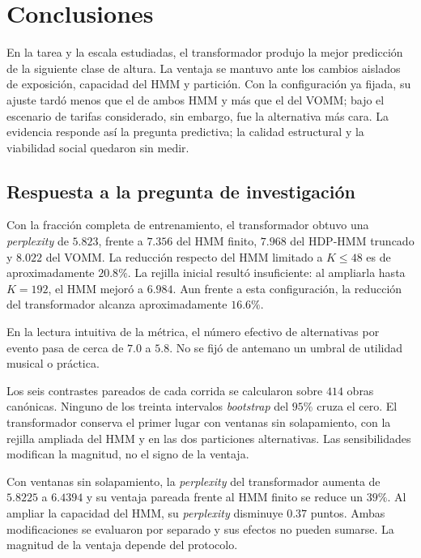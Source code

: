 \chapter{Conclusiones}
\label{chap:conclusiones}

En la tarea y la escala estudiadas, el transformador produjo la mejor predicción de la siguiente clase de altura. La ventaja se mantuvo ante los cambios aislados de exposición, capacidad del HMM y partición. Con la configuración ya fijada, su ajuste tardó menos que el de ambos HMM y más que el del VOMM; bajo el escenario de tarifas considerado, sin embargo, fue la alternativa más cara. La evidencia responde así la pregunta predictiva; la calidad estructural y la viabilidad social quedaron sin medir.

\section{Respuesta a la pregunta de investigación}

Con la fracción completa de entrenamiento, el transformador obtuvo una \emph{perplexity} de $5.823$, frente a $7.356$ del HMM finito, $7.968$ del HDP-HMM truncado y $8.022$ del VOMM. La reducción respecto del HMM limitado a $K\leq48$ es de aproximadamente $20.8\%$. La rejilla inicial resultó insuficiente: al ampliarla hasta $K=192$, el HMM mejoró a $6.984$. Aun frente a esta configuración, la reducción del transformador alcanza aproximadamente $16.6\%$.

En la lectura intuitiva de la métrica, el número efectivo de alternativas por evento pasa de cerca de $7.0$ a $5.8$. No se fijó de antemano un umbral de utilidad musical o práctica.

Los seis contrastes pareados de cada corrida se calcularon sobre $414$ obras canónicas. Ninguno de los treinta intervalos \emph{bootstrap} del $95\%$ cruza el cero. El transformador conserva el primer lugar con ventanas sin solapamiento, con la rejilla ampliada del HMM y en las dos particiones alternativas. Las sensibilidades modifican la magnitud, no el signo de la ventaja.

Con ventanas sin solapamiento, la \emph{perplexity} del transformador aumenta de $5.8225$ a $6.4394$ y su ventaja pareada frente al HMM finito se reduce un $39\%$. Al ampliar la capacidad del HMM, su \emph{perplexity} disminuye $0.37$ puntos. Ambas modificaciones se evaluaron por separado y sus efectos no pueden sumarse. La magnitud de la ventaja depende del protocolo.

